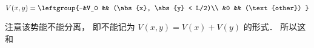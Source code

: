 
\begin{issues}
\issueDraft
\end{issues}

\begin{equation}
V(x,y) = \leftgroup{-&V_0 && (\abs{x}, \abs{y} < L/2)\\
&0 && (\text{other}) }
\end{equation}

注意该势能不能分离， 即不能记为 $V(x,y) = V(x) + V(y)$ 的形式． 所以这和
